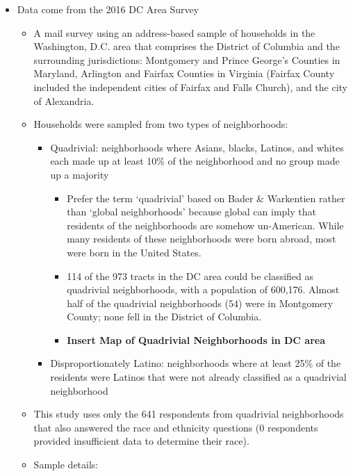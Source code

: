 \documentclass[]{article}
\providecommand{\tightlist}{%
  \setlength{\itemsep}{0pt}\setlength{\parskip}{0pt}}
\theoremstyle{definition}
\theoremstyle{definition}
\theoremstyle{definition}
\theoremstyle{remark}
\begin{document}
\begin{itemize}
\tightlist
\item
  Data come from the 2016 DC Area Survey

  \begin{itemize}
  \tightlist
  \item
    A mail survey using an address-based sample of households in the
    Washington, D.C. area that comprises the District of Columbia and
    the surrounding jurisdictions: Montgomery and Prince George's
    Counties in Maryland, Arlington and Fairfax Counties in Virginia
    (Fairfax County included the independent cities of Fairfax and Falls
    Church), and the city of Alexandria.
  \item
    Households were sampled from two types of neighborhoods:

    \begin{itemize}
    \tightlist
    \item
      Quadrivial: neighborhoods where Asians, blacks, Latinos, and
      whites each made up at least 10\% of the neighborhood and no group
      made up a majority

      \begin{itemize}
      \tightlist
      \item
        Prefer the term `quadrivial' based on Bader \& Warkentien rather
        than `global neighborhoods' because global can imply that
        residents of the neighborhoods are somehow un-American. While
        many residents of these neighborhoods were born abroad, most
        were born in the United States.
      \item
        114 of the 973 tracts in the DC area could be classified as
        quadrivial neighborhoods, with a population of 600,176. Almost
        half of the quadrivial neighborhoods (54) were in Montgomery
        County; none fell in the District of Columbia.
      \item
        \textbf{Insert Map of Quadrivial Neighborhoods in DC area}
      \end{itemize}
    \item
      Disproportionately Latino: neighborhoods where at least 25\% of
      the residents were Latinos that were not already classified as a
      quadrivial neighborhood
    \end{itemize}
  \item
    This study uses only the 641 respondents from quadrivial
    neighborhoods that also answered the race and ethnicity questions (0
    respondents provided insufficient data to determine their race).
  \item
    Sample details:


\end{itemize}
\end{itemize}
\end{document}
